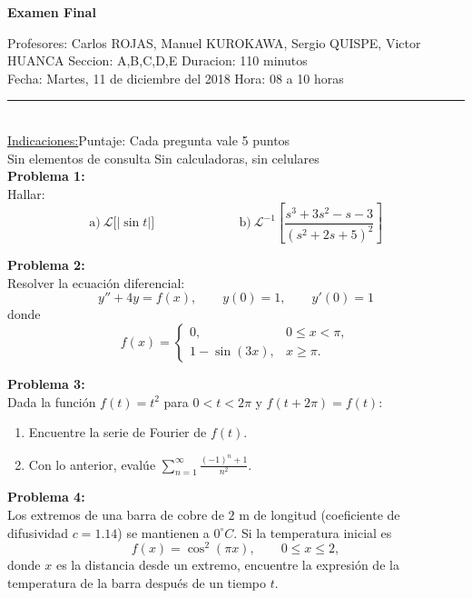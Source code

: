\documentclass[12pt]{article}
\begin{document}
\pagestyle{empty}

\begin{center}
\textbf{\large Examen Final}
\end{center}

\begin{small}
Profesores: Carlos ROJAS, Manuel KUROKAWA, Sergio QUISPE, Victor HUANCA \quad
Seccion: A,B,C,D,E \hfill Duracion: 110 minutos \\
Fecha: Martes, 11 de diciembre del 2018 \hfill Hora: 08 a 10 horas
\end{small}

\makebox[1pt][l]{\rule[3pt]{15cm}{1pt}}\rule{15cm}{1pt}\\
\underline{Indicaciones:}\hfill Puntaje: Cada pregunta vale 5 puntos\\
Sin elementos de consulta \hfill Sin calculadoras, sin celulares\\

\textbf{Problema 1:}\\
Hallar:
\[
\text{a)}\ \mathcal{L}\big[|\sin t|\big]\hspace{80pt}
\text{b)}\ \mathcal{L}^{-1}\!\left[\frac{s^{3}+3s^{2}-s-3}{(s^{2}+2s+5)^{2}}\right]
\]

\textbf{Problema 2:}\\
Resolver la ecuación diferencial:
\[
y''+4y=f(x),\qquad y(0)=1,\qquad y'(0)=1
\]
donde
\[
f(x)=
\begin{cases}
0,& 0\le x<\pi,\\
1-\sin(3x),& x\ge \pi.
\end{cases}
\]

\textbf{Problema 3:}\\
Dada la función $f(t)=t^2$ para $0<t<2\pi$ y $f(t+2\pi)=f(t)$:
\begin{enumerate}
\renewcommand{\theenumi}{\alph{enumi}}
\renewcommand{\labelenumi}{\theenumi)}
\item Encuentre la serie de Fourier de $f(t)$.
\item Con lo anterior, evalúe $\displaystyle\sum_{n=1}^{\infty}\frac{(-1)^{n}+1}{n^2}$.
\end{enumerate}

\textbf{Problema 4:}\\
Los extremos de una barra de cobre de $2$ m de longitud (coeficiente de difusividad $c=1.14$) se mantienen a $0^{\circ}C$. Si la temperatura inicial es
\[
f(x)=\cos^{2}(\pi x),\qquad 0\le x\le 2,
\]
donde $x$ es la distancia desde un extremo, encuentre la expresión de la temperatura de la barra después de un tiempo $t$.
\end{document}
